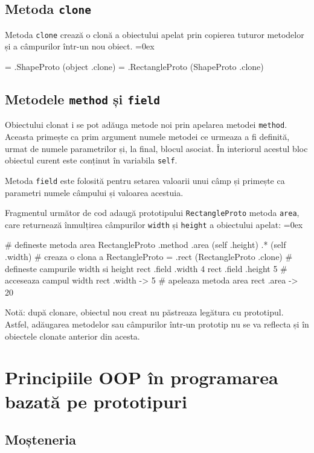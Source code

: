 \documentclass[12pt,a4paper]{memoir}
\renewcommand{\c}{\texttt}
\newenvironment{code}
{
\definecolor{shadecolor}{gray}{0.91}
\topsep=0ex
\relax
\shaded
\verbatim
}
{
\endverbatim
\endshaded
}
\begin{document}
\subsection{Metoda \c{clone}}

Metoda \c{clone} crează o clonă a obiectului apelat prin copierea tuturor metodelor și a câmpurilor într-un nou obiect. 
\begin{code}
= .ShapeProto (object .clone)
= .RectangleProto (ShapeProto .clone)
\end{code}

\subsection{Metodele \c{method} și \c{field}}

Obiectului clonat i se pot adăuga metode noi prin apelarea metodei \c{method}. Aceasta primește ca prim argument numele metodei ce urmeaza a fi definită, urmat de numele parametrilor și, la final, blocul asociat. În interiorul acestul bloc obiectul curent este conținut în variabila \c{self}.

Metoda \c{field} este folosită pentru setarea valoarii unui câmp și primește ca parametri numele câmpului și valoarea acestuia.

Fragmentul următor de cod adaugă prototipului \c{RectangleProto} metoda \c{area}, care returnează înmulțirea câmpurilor \c{width} și \c{height} a obiectului apelat:
\begin{code}
# defineste metoda area 
RectangleProto .method .area { 
  (self .height) .* (self .width)
}
# creaza o clona a RectangleProto
= .rect (RectangleProto .clone)
# defineste campurile width si height
rect .field .width 4
rect .field .height 5
# acceseaza campul width
rect .width
  -> 5
# apeleaza metoda area
rect .area
  -> 20
\end{code}

Notă: după clonare, obiectul nou creat nu păstreaza legătura cu prototipul. Astfel, adăugarea metodelor sau câmpurilor într-un prototip nu se va reflecta și în obiectele clonate anterior din acesta.

\section{Principiile OOP în programarea bazată pe prototipuri}

\subsection{Moșteneria}
\end{document}
